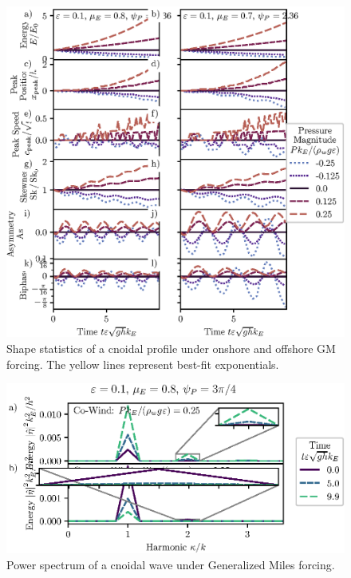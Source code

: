\documentclass{jfm}
\begin{document}
\begin{figure}
  \centering
  \includegraphics{Skew-Asymm-Cnoidal-GM.eps}
  \caption{
    Shape statistics of a cnoidal profile under onshore and offshore
    GM forcing. The yellow lines represent best-fit exponentials.
  }
\end{figure}

\begin{figure}
  \centering
  \includegraphics{Power-Spectrum-GM.eps}
  \caption{
    Power spectrum of a cnoidal wave under Generalized Miles forcing.
  }
\end{figure}
\end{document}
